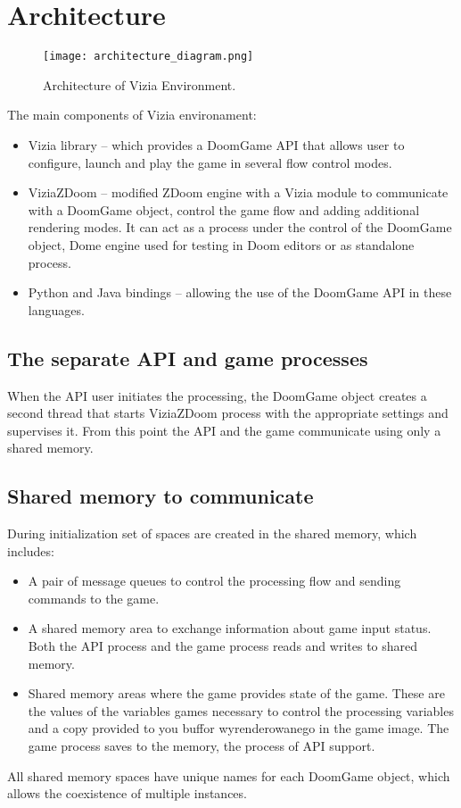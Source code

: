 \section{Architecture}\label{sec:architecture}
	\begin{figure}
			\centering
			\texttt{[image: architecture\_diagram.png]}
			\caption{Architecture of Vizia Environment.}\label{fig:architecture_diagram}
	\end{figure}

The main components of Vizia environament:
    \begin{itemize}
    \item Vizia library -- which provides a DoomGame API that allows user to configure, launch and play the game in several flow control modes.
    \item ViziaZDoom -- modified ZDoom engine with a Vizia module to communicate with a DoomGame object, control the game flow and adding additional rendering modes. It can act as a process under the control of the DoomGame object, Dome engine used for testing in Doom editors or as standalone process.
    \item Python and Java bindings -- allowing the use of the DoomGame API in these languages.
    \end{itemize}


\subsection{The separate API and game processes}\label{sec:architecture_separate_processes}

When the API user initiates the processing, the DoomGame object creates a second thread that starts ViziaZDoom process with the appropriate settings and supervises it. From this point the API and the game communicate using only a shared memory.


\subsection{Shared memory to communicate}\label{sec:architecture_shared_memory}

During initialization set of spaces are created in the shared memory, which includes:
    \begin{itemize}
    \item A pair of message queues to control the processing flow and sending commands to the game.
    \item A shared memory area to exchange information about game input status. Both the API process and the game process reads and writes to shared memory.
    \item Shared memory areas where the game provides state of the game. These are the values of the variables games necessary to control the processing variables and a copy provided to you buffor wyrenderowanego in the game image. The game process saves to the memory, the process of API support.
    \end{itemize}
All shared memory spaces have unique names for each DoomGame object, which allows the coexistence of multiple instances.



